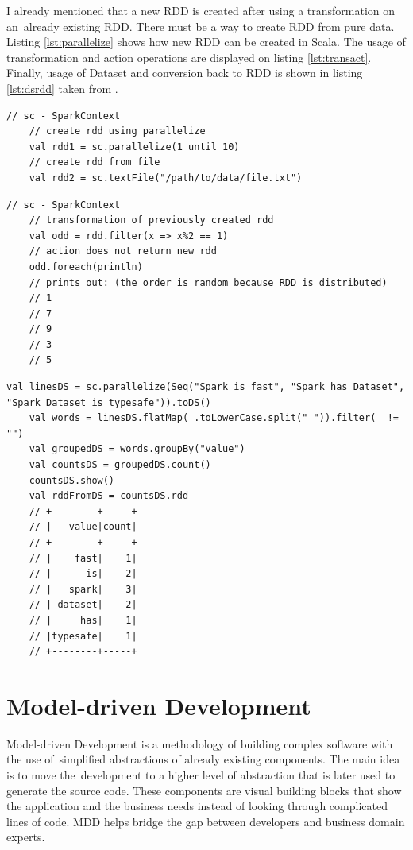 I already mentioned that a new RDD is created after using a transformation on an~already existing RDD. There must be a way to create RDD from pure data. Listing \ref{lst:parallelize} shows how new RDD can be created in Scala. The usage of transformation and action operations are displayed on listing \ref{lst:transact}. Finally, usage of Dataset and conversion back to RDD is shown in listing \ref{lst:dsrdd} taken from \cite{sparkdataset}.

\begin{lstlisting}[style=myScalastyle, caption={How to create new RDD}, label={lst:parallelize}]
    // sc - SparkContext
    // create rdd using parallelize
    val rdd1 = sc.parallelize(1 until 10)
    // create rdd from file
    val rdd2 = sc.textFile("/path/to/data/file.txt")
\end{lstlisting}



\begin{lstlisting}[style=myScalastyle, caption={Usage of transformation and action on RDD}, label={lst:transact}]
    // sc - SparkContext
    // transformation of previously created rdd
    val odd = rdd.filter(x => x%2 == 1)
    // action does not return new rdd
    odd.foreach(println)
    // prints out: (the order is random because RDD is distributed)
    // 1
    // 7
    // 9
    // 3
    // 5
\end{lstlisting}
\begin{lstlisting}[style=myScalastyle, caption={Usage of Dataset}, label={lst:dsrdd}]
    val linesDS = sc.parallelize(Seq("Spark is fast", "Spark has Dataset", "Spark Dataset is typesafe")).toDS()
    val words = linesDS.flatMap(_.toLowerCase.split(" ")).filter(_ != "")
    val groupedDS = words.groupBy("value")
    val countsDS = groupedDS.count()
    countsDS.show()
    val rddFromDS = countsDS.rdd
    // +--------+-----+
    // |   value|count|
    // +--------+-----+
    // |    fast|    1|
    // |      is|    2|
    // |   spark|    3|
    // | dataset|    2|
    // |     has|    1|
    // |typesafe|    1|
    // +--------+-----+
\end{lstlisting}


\chapter{Model-driven Development}
\label{chap:mdd}
Model-driven Development is a methodology of building complex software with the use of~simplified abstractions of already existing components. The main idea is to move the~development to a higher level of abstraction that is later used to generate the source code.   These components are visual building blocks that show the application and the business needs instead of looking through complicated lines of code. MDD helps bridge the gap between developers and business domain experts. 

